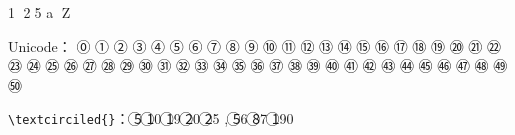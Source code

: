 \documentclass{article}
\begin{document}
\textcircled{1}
\textcircled{25}
\textcircled{a}
\textcircled{Z}

Unicode：
⓪ ① ② ③ ④ ⑤ ⑥ ⑦ ⑧ ⑨ ⑩ ⑪	⑫ ⑬	⑭ ⑮	⑯ ⑰ ⑱ ⑲	⑳ ㉑ ㉒	㉓	㉔	㉕	㉖	㉗	㉘	㉙	㉚ ㉛	㉜	㉝	㉞	㉟	㊱	㊲	㊳	㊴	㊵ ㊶ ㊷ ㊸	㊹	㊺	㊻	㊼	㊽	㊾	㊿ 

\verb|\textcirciled{}|：
\textcircled{5} \textcircled{10} \textcircled{19} \textcircled{20} \textcircled{25} , \textcircled{56} \textcircled{87}  \textcircled{190}

\end{document}
